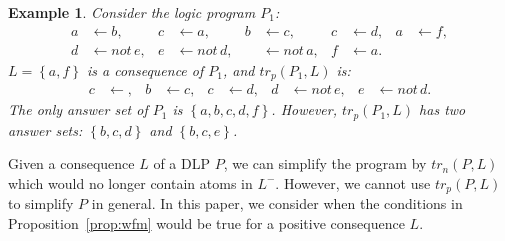 \documentclass{article}
\makeatletter
\newtheorem{example}{Example}
\newcommand\ie{{\it i.e.\@}}
\newcommand{\set}[1]{\left\{#1\right\}}
\newcommand{\Not}{not \,}
\newcommand{\trn}{tr_n}
\newcommand{\trp}{tr_p}
\makeatother
\begin{document}

\begin{example}
  Consider the logic program $P_1$:
\begin{align*}
 a &\gets b, & c &\gets a, & b&\gets c, & c&\gets d, & a&\gets f, \\ d&\gets \Not e, & e &\gets \Not d,  & &\gets \Not a, & f&\gets a.
\end{align*}
$L = \set{a,f}$ is a consequence of $P_1$, and $\trp(P_1, L)$ is:
\begin{align*}
  c &\gets, & b&\gets c, & c&\gets d, &
  d&\gets \Not e, & e &\gets \Not d.
\end{align*}
The only answer set of $P_1$ is $\set{a, b, c, d, f}$. However, $\trp(P_1, L)$ has two answer sets: $\set{b, c, d}$ and $\set{b,c, e}$.
\end{example}

Given a consequence $L$ of a DLP $P$, we can simplify the program by $\trn(P, L)$ which would no longer contain atoms in $L^-$. However, we cannot use $\trp(P, L)$ to simplify $P$ in general.
In this paper, we consider when the conditions in Proposition~\ref{prop:wfm} would be true for a positive consequence $L$.

%
%
\end{document}
